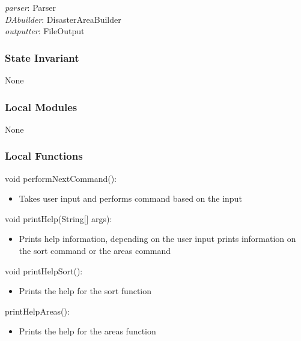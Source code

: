 \documentclass[12pt]{article}
\begin{document}
                    \textit{parser}: Parser\\
                    \textit{DAbuilder}: DisasterAreaBuilder\\
                    \textit{outputter}: FileOutput\\
                    
                \subsubsection *{State Invariant}
                
                None
                
                \subsubsection*{Local Modules}
                
                None
                
                \subsubsection*{Local Functions}
                
                \noindent void performNextCommand():
			    \begin{itemize}
			        \item Takes user input and performs command based on the input
			    \end{itemize}
                
                \noindent void printHelp(String[] args):
			    \begin{itemize}
			        \item Prints help information, depending on the user input prints information on the sort command or the areas command
			    \end{itemize}
                
                \noindent void printHelpSort():
			    \begin{itemize}
			        \item Prints the help for the sort function
			    \end{itemize}
                
                \noindent printHelpAreas():
			    \begin{itemize}
			        \item Prints the help for the areas function
			    \end{itemize}
                
\end{document}
